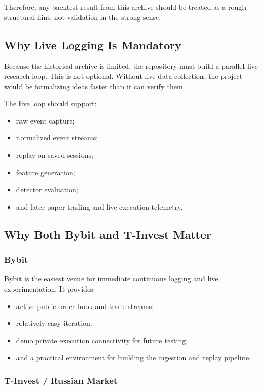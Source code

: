 Therefore, any backtest result from this archive should be treated as a rough structural hint, not validation in the strong sense.

\subsection{Why Live Logging Is Mandatory}

Because the historical archive is limited, the repository must build a parallel live-research loop.
This is not optional.
Without live data collection, the project would be formalizing ideas faster than it can verify them.

The live loop should support:
\begin{itemize}
  \item raw event capture;
  \item normalized event streams;
  \item replay on saved sessions;
  \item feature generation;
  \item detector evaluation;
  \item and later paper trading and live execution telemetry.
\end{itemize}

\subsection{Why Both Bybit and T-Invest Matter}

\subsubsection{Bybit}

Bybit is the easiest venue for immediate continuous logging and live experimentation.
It provides:
\begin{itemize}
  \item active public order-book and trade streams;
  \item relatively easy iteration;
  \item demo private execution connectivity for future testing;
  \item and a practical environment for building the ingestion and replay pipeline.
\end{itemize}

\subsubsection{T-Invest / Russian Market}

